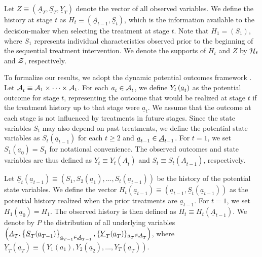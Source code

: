 Let $Z\equiv(\underline{A}_{T},\underline{S}_T,\underline{Y}_{T})$ denote the vector of all observed variables. We define the history at stage $t$ as $H_t \equiv (\underline{A}_{t-1},\underline{S}_t)$, which is the information available to the decision-maker when selecting the treatment at stage $t$. Note that $H_1 = (S_1)$, where $S_1$ represents individual characteristics observed prior to the beginning of the sequential treatment intervention. We denote the supports of $H_{t}$ and $Z$ by ${\cal H}_{t}$ and $\mathcal{Z}$, respectively.

To formalize our results, we adopt the dynamic potential outcomes framework \citep{Robins_1986, Hernan_et_al_2001, Murphy_2003}. Let $\underline{\mathcal{A}}_t \equiv \mathcal{A}_1 \times \cdots \times \mathcal{A}_t$. For each $\underline{a}_t \in \underline{\mathcal{A}}_t$, we define $Y_{t}\left(\text{\ensuremath{\underline{a}}}_{t}\right)$ as the potential outcome for stage $t$, representing the outcome that would be realized at stage $t$ if the treatment history up to that stage were $\underline{a}_{t}$. We assume that the outcome at each stage is not influenced by treatments in future stages. Since the state variables $S_t$ may also depend on past treatments, we define the potential state variables as $S_{t}(\underline{a}_{t-1})$ for each $t\geq 2$ and $\underline{a}_{t-1} \in \underline{\mathcal{A}}_{t-1}$. For $t = 1$, we set $S_{1}(\underline{a}_{0}) = S_1$ for notational convenience. The observed outcomes and state variables are thus defined as $Y_{t} \equiv Y_{t}(\underline{A}_t)$ and $S_t \equiv S_t(\underline{A}_{t-1})$, respectively. 

Let $\underline{S}_t(\underline{a}_{t-1}) \equiv (S_1,S_2(\underline{a}_{1}),\ldots,S_t(\underline{a}_{t-1}))$ be the history of the potential state variables. We define the vector $H_{t}\left(\underline{a}_{t-1}\right) \equiv \left(\underline{a}_{t-1},\underline{S}_t(\underline{a}_{t-1})\right)$  as the potential history realized when the prior treatments are $\underline{a}_{t-1}$. For $t=1$, we set $H_{1}\left(\underline{a}_{0}\right) = H_1$. The observed history is then defined as $H_t \equiv H_t\left(\underline{A}_{t-1}\right)$.
We denote by $P$ the distribution of all underlying variables $\left(\underline{A}_T,\left\{\underline{S}_T(\underline{a}_{T-1})\right\}_{\underline{a}_{T-1} \in \underline{\mathcal{A}}_{T-1}},\{\underline{Y}_{T}(\underline{a}_T)\}_{\underline{a}_T \in \underline{\mathcal{A}}_T}\right)$, where  $\underline{Y}_T(\underline{a}_T) \equiv (Y_1(a_1),Y_2(\underline{a}_{2}),\ldots,Y_T(\underline{a}_{T}))$.


